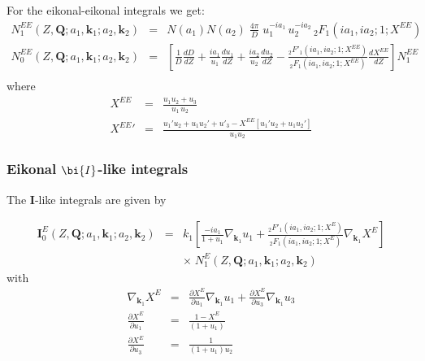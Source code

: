 For the eikonal-eikonal integrals we get:
\begin{eqnarray}\label{Q:NEE}
N^{EE}_{1} \left(Z, \bm{Q} ; a_{1}, \bm{k}_{1} ; a_{2}, \bm{k}_{2}
\right) &=&  N(a_{1}) N(a_{2})\;\frac{4 \pi}{D} \; u_{1}^{-i a_{1}}
\, u_{2}^{-i a_{2}} \, {_{2}F_{1}}\left( i a_{1} , i a_{2} ; 1
; X^{EE} \right)
\\
N^{EE}_{0} \left(Z, \bm{Q} ; a_{1}, \bm{k}_{1} ; a_{2}, \bm{k}_{2}
\right) &=& \left[ \frac{1}{D} \frac{d D}{d Z} + \frac{i
a_{1}}{u_{1}} \frac{d u_{1}}{d Z} + \frac{i a_{2}}{u_{2}}
\frac{d u_{2}}{d Z} - \frac{{_{2}F'_{1}}(i a_{1}, i a_{2};
1; X^{EE})}{{_{2}F_{1}}(i a_{1}, i a_{2}; 1; X^{EE})} \frac{d
X^{EE}}{d Z} \right] N^{EE}_{1}
\nonumber \\
\end{eqnarray}
%
where
\begin{eqnarray*}
X^{EE} &=& \frac{u_{1} u_{2} + u_{3}}{u_{1} \, u_{2}}  \nonumber \\
{X^{EE}}' &=& \frac{ u_{1}' u_{2} + u_{1} u_{2}' + u'_{3} - X^{EE}
\left[ u_{1}' u_{2} + u_{1} u_{2}' \right]}{u_{1} u_{2}}
\end{eqnarray*}
%
\subsubsection{Eikonal $\bi{I}$-like integrals}

The $\bm{I}$-like integrals are given by

\begin{eqnarray}\label{Q:I_Eik}
\bm{I}^{E}_{0} \left(Z, \bm{Q}; a_{1}, \bm{k}_{1} ; a_{2}, \bm{k}_{2}
\right) &=& k_{1}  \left[ \frac{- i a_{1}}{1 + u_{1}}
\nabla_{\bm{k}_{1}} u_{1}  + \frac{{_{2}F'_{1}}(i a_{1}, i a_{2};
1; X^{E})}{{_{2}F_{1}}(i a_{1}, i a_{2}; 1; X^{E})}
\nabla_{\bm{k}_{1}} X^{E} \right] \nonumber
\\
&& {\times} \; N^{E}_{1}(Z,\bm{Q}; a_{1},\bm{k}_{1}; a_{2},\bm{k}_{2})
\end{eqnarray}
%
with
\begin{eqnarray*}
\nabla_{\bm{k}_{1}} X^{E} &=& \frac{\partial X^{E}}{\partial u_{1}}
\nabla_{\bm{k}_{1}} u_{1} + \frac{\partial X^{E}}{\partial u_{3}}
\nabla_{\bm{k}_{1}} u_{3}
\\
\frac{\partial X^{E}}{\partial u_{1}}  &=& \frac{1-X^{E}}{( 1 + u_{1})}
\nonumber \\
\frac{\partial X^{E}}{\partial u_{3}}  &=& \frac{1}{ ( 1 + u_{1})
u_{2}} \nonumber
\end{eqnarray*}


